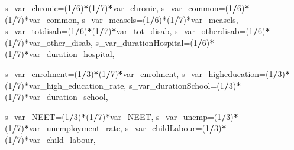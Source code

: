 \documentclass[
]{article}
\newenvironment{Shaded}{\begin{snugshade}}{\end{snugshade}}
\newcommand{\AttributeTok}[1]{\textcolor[rgb]{0.13,0.29,0.53}{#1}}
\newcommand{\DecValTok}[1]{\textcolor[rgb]{0.00,0.00,0.81}{#1}}
\newcommand{\NormalTok}[1]{#1}
\newcommand{\SpecialCharTok}[1]{\textcolor[rgb]{0.81,0.36,0.00}{\textbf{#1}}}
\begin{document}
\begin{Shaded}
\begin{Highlighting}[]
    \AttributeTok{s\_var\_chronic=}\NormalTok{(}\DecValTok{1}\SpecialCharTok{/}\DecValTok{6}\NormalTok{)}\SpecialCharTok{*}\NormalTok{(}\DecValTok{1}\SpecialCharTok{/}\DecValTok{7}\NormalTok{)}\SpecialCharTok{*}\NormalTok{var\_chronic,}
    \AttributeTok{s\_var\_common=}\NormalTok{(}\DecValTok{1}\SpecialCharTok{/}\DecValTok{6}\NormalTok{)}\SpecialCharTok{*}\NormalTok{(}\DecValTok{1}\SpecialCharTok{/}\DecValTok{7}\NormalTok{)}\SpecialCharTok{*}\NormalTok{var\_common,}
    \AttributeTok{s\_var\_measels=}\NormalTok{(}\DecValTok{1}\SpecialCharTok{/}\DecValTok{6}\NormalTok{)}\SpecialCharTok{*}\NormalTok{(}\DecValTok{1}\SpecialCharTok{/}\DecValTok{7}\NormalTok{)}\SpecialCharTok{*}\NormalTok{var\_measels,}
    \AttributeTok{s\_var\_totdisab=}\NormalTok{(}\DecValTok{1}\SpecialCharTok{/}\DecValTok{6}\NormalTok{)}\SpecialCharTok{*}\NormalTok{(}\DecValTok{1}\SpecialCharTok{/}\DecValTok{7}\NormalTok{)}\SpecialCharTok{*}\NormalTok{var\_tot\_disab,}
    \AttributeTok{s\_var\_otherdisab=}\NormalTok{(}\DecValTok{1}\SpecialCharTok{/}\DecValTok{6}\NormalTok{)}\SpecialCharTok{*}\NormalTok{(}\DecValTok{1}\SpecialCharTok{/}\DecValTok{7}\NormalTok{)}\SpecialCharTok{*}\NormalTok{var\_other\_disab,}
    \AttributeTok{s\_var\_durationHospital=}\NormalTok{(}\DecValTok{1}\SpecialCharTok{/}\DecValTok{6}\NormalTok{)}\SpecialCharTok{*}\NormalTok{(}\DecValTok{1}\SpecialCharTok{/}\DecValTok{7}\NormalTok{)}\SpecialCharTok{*}\NormalTok{var\_duration\_hospital,}
    
    \AttributeTok{s\_var\_enrolment=}\NormalTok{(}\DecValTok{1}\SpecialCharTok{/}\DecValTok{3}\NormalTok{)}\SpecialCharTok{*}\NormalTok{(}\DecValTok{1}\SpecialCharTok{/}\DecValTok{7}\NormalTok{)}\SpecialCharTok{*}\NormalTok{var\_enrolment,}
    \AttributeTok{s\_var\_higheducation=}\NormalTok{(}\DecValTok{1}\SpecialCharTok{/}\DecValTok{3}\NormalTok{)}\SpecialCharTok{*}\NormalTok{(}\DecValTok{1}\SpecialCharTok{/}\DecValTok{7}\NormalTok{)}\SpecialCharTok{*}\NormalTok{var\_high\_education\_rate,}
    \AttributeTok{s\_var\_durationSchool=}\NormalTok{(}\DecValTok{1}\SpecialCharTok{/}\DecValTok{3}\NormalTok{)}\SpecialCharTok{*}\NormalTok{(}\DecValTok{1}\SpecialCharTok{/}\DecValTok{7}\NormalTok{)}\SpecialCharTok{*}\NormalTok{var\_duration\_school,}
    
    \AttributeTok{s\_var\_NEET=}\NormalTok{(}\DecValTok{1}\SpecialCharTok{/}\DecValTok{3}\NormalTok{)}\SpecialCharTok{*}\NormalTok{(}\DecValTok{1}\SpecialCharTok{/}\DecValTok{7}\NormalTok{)}\SpecialCharTok{*}\NormalTok{var\_NEET,}
    \AttributeTok{s\_var\_unemp=}\NormalTok{(}\DecValTok{1}\SpecialCharTok{/}\DecValTok{3}\NormalTok{)}\SpecialCharTok{*}\NormalTok{(}\DecValTok{1}\SpecialCharTok{/}\DecValTok{7}\NormalTok{)}\SpecialCharTok{*}\NormalTok{var\_unemployment\_rate,}
    \AttributeTok{s\_var\_childLabour=}\NormalTok{(}\DecValTok{1}\SpecialCharTok{/}\DecValTok{3}\NormalTok{)}\SpecialCharTok{*}\NormalTok{(}\DecValTok{1}\SpecialCharTok{/}\DecValTok{7}\NormalTok{)}\SpecialCharTok{*}\NormalTok{var\_child\_labour,}
    

\end{Highlighting}
\end{Shaded}
\end{document}
